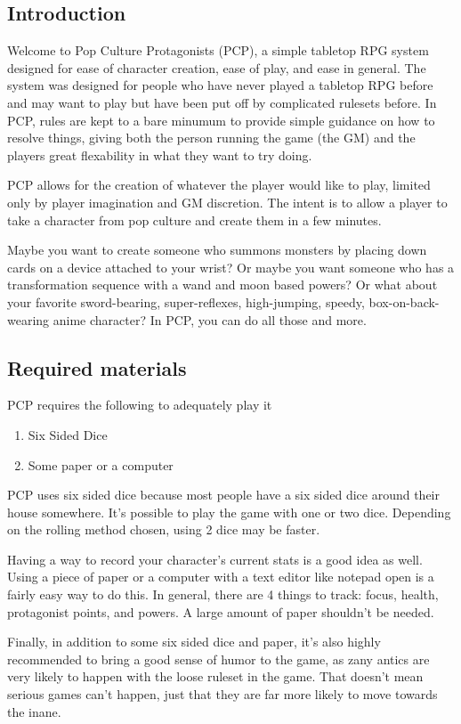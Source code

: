 \begin{flushleft}

\chapter{Introduction}

Welcome to Pop Culture Protagonists (PCP), a simple tabletop RPG system designed
for ease of character creation, ease of play, and ease in general. The system
was designed for people who have never played a tabletop RPG before and may
want to play but have been put off by complicated rulesets before. In PCP,
rules are kept to a bare minumum to provide simple guidance on how to resolve
things, giving both the person running the game (the GM) and the players great
flexability in what they want to try doing.

PCP allows for the creation of whatever the player would like to play, limited
only by player imagination and GM discretion. The intent is to allow a player
to take a character from pop culture and create them in a few minutes.

Maybe you want to create someone who summons monsters by placing down cards on a
device attached to your wrist? Or maybe you want someone who has a
transformation sequence with a wand and moon based powers? Or what about your
favorite sword-bearing, super-reflexes, high-jumping, speedy,
box-on-back-wearing anime character? In PCP, you can do all those and more.

\section*{Required materials}

PCP requires the following to adequately play it

\begin{enumerate}
    \item Six Sided Dice
    \item Some paper or a computer
\end{enumerate}

PCP uses six sided dice because most people have a six sided dice around
their house somewhere. It's possible to play the game with one or two dice.
Depending on the rolling method chosen, using 2 dice may be faster.

Having a way to record your character's current stats is a good idea as well.
Using a piece of paper or a computer with a text editor like notepad open is
a fairly easy way to do this. In general, there are 4 things to track: focus,
health, protagonist points, and powers. A large amount of paper shouldn't be
needed.

Finally, in addition to some six sided dice and paper, it's also highly
recommended to bring a good sense of humor to the game, as zany antics are very
likely to happen with the loose ruleset in the game. That doesn't mean serious
games can't happen, just that they are far more likely to move towards the
inane.

\end{flushleft}
